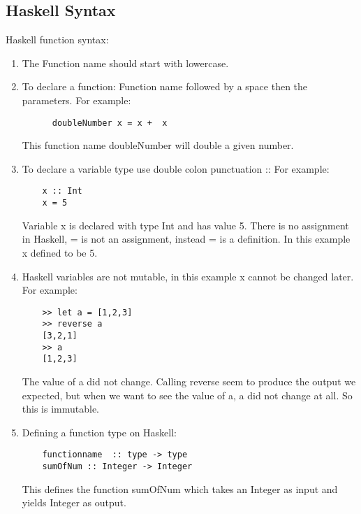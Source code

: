 \documentclass{article}
\begin{document}
\subsection{Haskell Syntax}
Haskell function syntax:
\begin{enumerate}
\item The Function name should start with lowercase.
\item To declare a function: Function name followed by a space then the parameters. 
\newline \newline For example: 
\begin{lstlisting}
	  doubleNumber x = x +  x    
\end{lstlisting} 
This function name doubleNumber will double a given number.
\newline
\item To declare a variable type use double colon punctuation ::
 \newline \newline For example: 
\begin{lstlisting}
	x :: Int
	x = 5
\end{lstlisting}
                     Variable x is declared with type Int and has value 5.
                     \newline
                     \newline
                     There is no assignment in Haskell, = is not an assignment, instead = is a definition. In this example x defined to be 5. 
\newline
\item Haskell variables are not mutable, in this example x cannot be changed later. 
\newline \newline For example:  
\begin{lstlisting}
	>> let a = [1,2,3]
	>> reverse a
	[3,2,1]
	>> a
	[1,2,3]
\end{lstlisting}
     The value of a did not change. Calling reverse seem to produce the output we expected, but when we want to see the value of a, a did not change at all. So this is immutable.
     \newline
\item  Defining a function type on Haskell:
\begin{lstlisting}
	functionname  :: type -> type
	sumOfNum :: Integer -> Integer
\end{lstlisting}
         This defines the function sumOfNum which takes an Integer  as input and yields Integer as output.
\end{enumerate}
\end{document}
